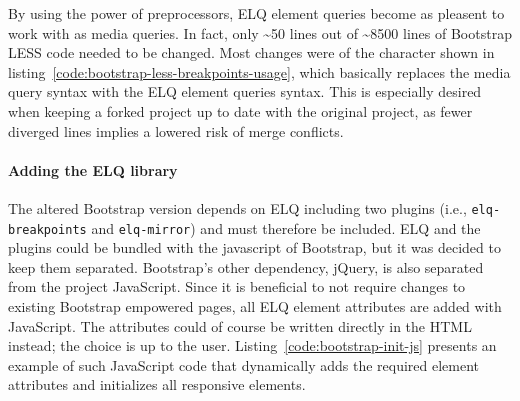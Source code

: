 \documentclass[a4paper,11pt]{kth-mag}
\newcommand{\code}[1]{\texttt{#1}}
\begin{document}
      By using the power of preprocessors, \gls{ELQ} element queries become as pleasent to work with as media queries.
      In fact, only \textasciitilde50 lines out of \textasciitilde8500 lines of Bootstrap \gls{LESS} code needed to be changed.
      Most changes were of the character shown in listing~\ref{code:bootstrap-less-breakpoints-usage}, which basically replaces the media query syntax with the \gls{ELQ} element queries syntax.
      This is especially desired when keeping a forked project up to date with the original project, as fewer diverged lines implies a lowered risk of merge conflicts.

      \paragraph{Adding the \gls{ELQ} library}
      The altered Bootstrap version depends on \gls{ELQ} including two plugins (i.e., \code{elq-breakpoints} and \code{elq-mirror}) and must therefore be included.
      \gls{ELQ} and the plugins could be bundled with the javascript of Bootstrap, but it was decided to keep them separated.
      Bootstrap's other dependency, jQuery, is also separated from the project JavaScript.
      Since it is beneficial to not require changes to existing Bootstrap empowered pages, all \gls{ELQ} element attributes are added with \gls{JavaScript}.
      The attributes could of course be written directly in the \gls{HTML} instead; the choice is up to the user.
      Listing~\ref{code:bootstrap-init-js} presents an example of such JavaScript code that dynamically adds the required element attributes and initializes all responsive elements.
\end{document}

